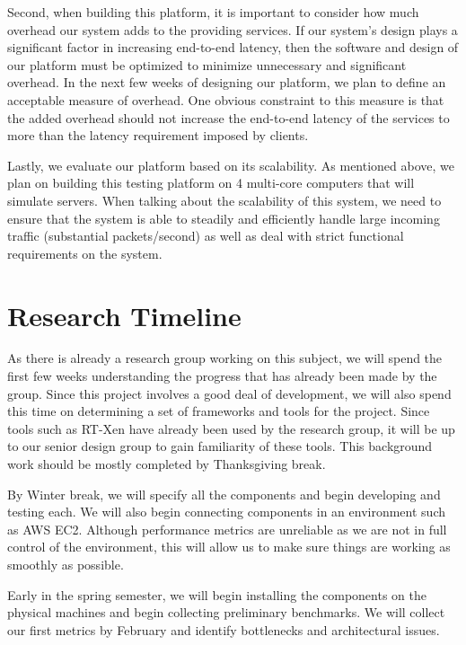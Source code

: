 \documentclass{sig-alternate}
\begin{document}
Second, when building this platform, it is important to consider how much overhead our system adds to the providing services. If our system's design plays a significant factor in increasing end-to-end latency, then the software and design of our platform must be optimized to minimize unnecessary and significant overhead. In the next few weeks of designing our platform, we plan to define an acceptable measure of overhead. One obvious constraint to this measure is that the added overhead should not increase the end-to-end latency of the services to more than the latency requirement imposed by clients.

Lastly, we evaluate our platform based on its scalability. As mentioned above, we plan on building this testing platform on 4 multi-core computers that will simulate servers. When talking about the scalability of this system, we need to ensure that the system is able to steadily and efficiently handle large incoming traffic (substantial packets/second) as well as deal with strict functional requirements on the system.


\section{Research Timeline}
\label{sec:research_timeline}

As there is already a research group working on this subject, we will spend the first few weeks understanding the progress that has already been made by the group. Since this project involves a good deal of development, we will also spend this time on determining a set of frameworks and tools for the project. Since tools such as RT-Xen have already been used by the research group, it will be up to our senior design group to gain familiarity of these tools. This background work should be mostly completed by Thanksgiving break.

By Winter break, we will specify all the components and begin developing and testing each. We will also begin connecting components in an environment such as AWS EC2. Although performance metrics are unreliable as we are not in full control of the environment, this will allow us to make sure things are working as smoothly as possible.

Early in the spring semester, we will begin installing the components on the physical machines and begin collecting preliminary benchmarks. We will collect our first metrics by February and identify bottlenecks and architectural issues.
\end{document}
